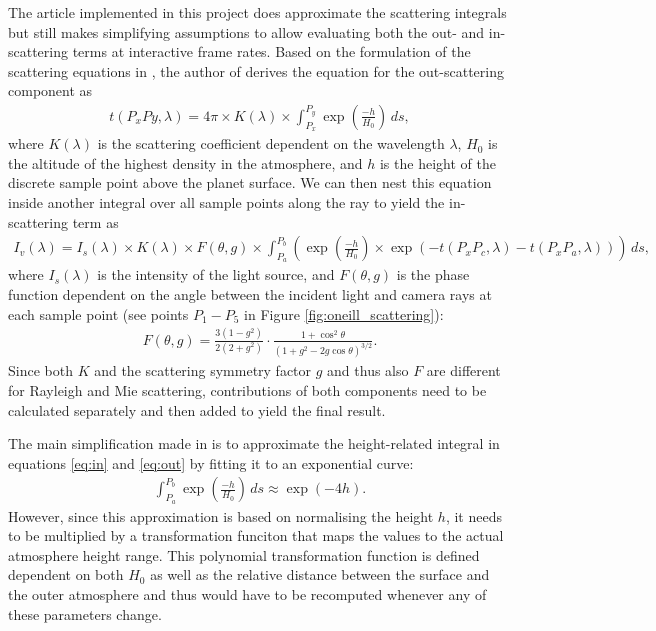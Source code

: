\documentclass[12pt]{article}
\begin{document}
The article \cite{oneil_chapter_nodate} implemented in this project does approximate the scattering integrals but still makes simplifying assumptions to allow evaluating both the out- and in-scattering terms at interactive frame rates.
Based on the formulation of the scattering equations in \cite{nishita_display_1993}, the author of \cite{oneil_chapter_nodate} derives the equation for the out-scattering component as
\begin{align}
    t(P_x Py, \lambda) = 4\pi \times K(\lambda) \times \int_{P_x}^{P_y} \exp\left( \frac{-h}{H_0} \right) \, ds,
    \label{eq:out}
\end{align}
where $K(\lambda)$ is the scattering coefficient dependent on the wavelength $\lambda$, $H_0$ is the altitude of the highest density in the atmosphere, and $h$ is the height of the discrete sample point above the planet surface.
We can then nest this equation inside another integral over all sample points along the ray to yield the in-scattering term as
\begin{align}
    I_v(\lambda) = I_s(\lambda) \times K(\lambda) \times F(\theta, g) \times \int_{P_a}^{P_b} \left( \exp\left( \frac{-h}{H_0} \right) \times \exp\left( -t(P_xP_c, \lambda) - t(P_xP_a, \lambda) \right) \right) \, ds,
    \label{eq:in}
\end{align}
where $I_s(\lambda)$ is the intensity of the light source, and $F(\theta, g)$ is the phase function dependent on the angle between the incident light and camera rays at each sample point (see points $P_1 - P_5$ in Figure \ref{fig:oneill_scattering}):
\begin{align}
    F(\theta, g) = \frac{3 (1 - g^2)}{2 (2 + g^2)} \cdot \frac{1 + \cos^2\theta}{\left(1 + g^2 - 2g\cos\theta\right)^{3/2}}.
    \label{eq:phase}
\end{align}
Since both $K$ and the scattering symmetry factor $g$ and thus also $F$ are different for Rayleigh and Mie scattering, contributions of both components need to be calculated separately and then added to yield the final result.

The main simplification made in \cite{oneil_chapter_nodate} is to approximate the height-related integral in equations \eqref{eq:in} and \eqref{eq:out} by fitting it to an exponential curve:
\begin{align}
    \int_{P_a}^{P_b} \exp\left( \frac{-h}{H_0} \right) \, ds \approx \exp(-4h).
    \label{eq:approx}
\end{align}
However, since this approximation is based on normalising the height $h$, it needs to be multiplied by a transformation funciton that maps the values to the actual atmosphere height range.
This polynomial transformation function is defined dependent on both $H_0$ as well as the relative distance between the surface and the outer atmosphere and thus would have to be recomputed whenever any of these parameters change.
\end{document}
